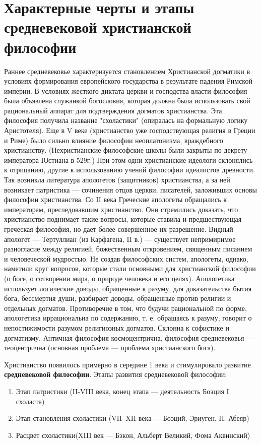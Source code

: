 \documentclass[12pt]{article}
\begin{document}
\section{Характерные черты и этапы средневековой христианской философии}
Раннее  средневековье  характеризуется  становлением  Христианской  догматики  в  условиях  формирования
европейского  государства  в  результате  падения  Римской  империи.  В  условиях  жесткого  диктата  церкви  и
господства власти философия была объявлена служанкой богословия, которая должна была использовать свой
рациональный  аппарат  для  подтверждения  догматов  христианства.  Эта  философия  получила  название
"схоластики" (опиралась на формальную логику Аристотеля).
Еще в V веке (христианство уже господствующая религия в Греции и Риме) было сильно влияние философии
неоплатонизма,  враждебного  христианству. (Нехристианские  философские  школы  были  закрыты  по  декрету
императора  Юстиана  в  529г.)  При  этом  одни  христианские  идеологи  склонялись  к  отрицанию,  другие  к 
использованию  учений  философии идеалистов  древности.  Так  возникла  литература апологетов (защитников)
христианства,  а  за  ней  возникает  патристика --- сочинения отцов 
церкви,  писателей,  заложивших  основы философии христианства.
Со II века Греческие апологеты обращались к императорам, преследовавшим христианство. Они стремились
доказать,  что  христианство  поднимает  такие  вопросы,  которые  ставила  и  предшествующая  греческая
философия, но дает более совершенное их разрешение. Видный апологет --- Тертуллиан (из Карфагена, II в.)
--- существует
непримиримое  разногласие  между  религией,  божественным  откровением,  священным  писанием  и 
человеческой
мудростью. Не создав философских систем, апологеты, однако, наметили круг вопросов,
которые стали основными для христианской философии (о
боге,  о  сотворении  мира,  о  природе  человека  и  его  целях).  Апологетика  использует  логические  доводы,
обращенные к разуму, для доказательства бытия бога, бессмертия души, разбирает доводы, обращенные против
религии  и  отдельных  догматов.  Противоречие  в  том,  что  будучи  рациональной  по  форме,  апологетика
иррациональна по содержанию, т. е. обращаясь к разуму, говорит о непостижимости разумом религиозных
догматов.
Склонна к софистике и догматизму.
Античная философия космоцентрична, философия средневековья --- теоцентрична (основная проблема
--- проблема
христианского бога).

Христианство появилось примерно в середине 1 века и стимулировало развитие
\textbf{средневековой философии}.
Этапы развития средневековой философии:
\begin{enumerate}
  \item Этап патристики (II-VIII века, конец этапа --- деятельность Боэция I схоласта)
  \item Этап становления схоластики (VII–XII века --- Боэций, Эриуген, П. Абеяр)
  \item Расцвет схоластики(XIII век --- Бэкон, Альберт Великий, Фома Аквинский)
\end{enumerate}
\end{document}
